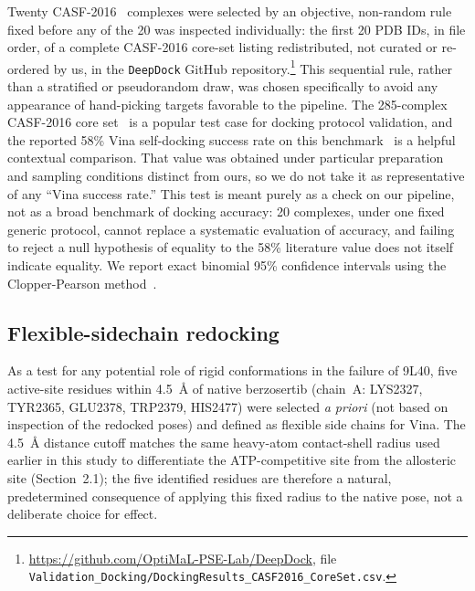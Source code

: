 \documentclass[global,twocolumn]{svjour}
\begin{document}
Twenty CASF-2016~\cite{su2019} complexes were selected by an objective,
non-random rule fixed before any of the 20 was inspected individually: the
first 20 PDB IDs, in file order, of a complete CASF-2016 core-set listing
redistributed, not curated or re-ordered by us, in the \texttt{DeepDock}
GitHub repository.\footnote{\url{https://github.com/OptiMaL-PSE-Lab/DeepDock},
file \texttt{Validation\_Docking/DockingResults\_CASF2016\_CoreSet.csv}.}
This sequential rule, rather than a stratified or pseudorandom draw, was
chosen specifically to avoid any appearance of hand-picking targets
favorable to the pipeline. The 285-complex CASF-2016 core
set~\cite{su2019} is a popular test case for docking protocol validation,
and the reported 58\% Vina self-docking success rate on this
benchmark~\cite{zhang2023} is a helpful contextual comparison. That value
was obtained under particular preparation and sampling conditions distinct
from ours, so we do not take it as representative of any ``Vina success
rate.'' This test is meant purely as a check on our pipeline, not as a
broad benchmark of docking accuracy: 20 complexes, under one fixed generic
protocol, cannot replace a systematic evaluation of accuracy, and failing
to reject a null hypothesis of equality to the 58\% literature value does
not itself indicate equality. We report exact binomial 95\% confidence
intervals using the Clopper-Pearson method~\cite{clopper1934}.

\subsection{Flexible-sidechain redocking}

As a test for any potential role of rigid conformations in the failure of
9L40, five active-site residues within 4.5~\AA{} of native berzosertib
(chain~A: LYS2327, TYR2365, GLU2378, TRP2379, HIS2477) were selected
\emph{a priori} (not based on inspection of the redocked poses) and defined
as flexible side chains for Vina. The 4.5~\AA{} distance cutoff matches the
same heavy-atom contact-shell radius used earlier in this study to
differentiate the ATP-competitive site from the allosteric site
(Section~2.1); the five identified residues are therefore a natural,
predetermined consequence of applying this fixed radius to the native pose,
not a deliberate choice for effect.
\end{document}
